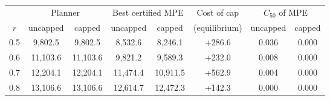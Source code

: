 \begin{tabular}{cccccccc}
\toprule
 & \multicolumn{2}{c}{Planner} & \multicolumn{2}{c}{Best certified MPE} & Cost of cap & \multicolumn{2}{c}{$C_{50}$ of MPE} \\
$r$ & uncapped & capped & uncapped & capped & (equilibrium) & uncapped & capped \\
\midrule
0.5 & 9{,}802.5 & 9{,}802.5 & 8{,}532.6 & 8{,}246.1 & +286.6 & 0.036 & 0.000 \\
0.6 & 11{,}103.6 & 11{,}103.6 & 9{,}821.2 & 9{,}589.3 & +232.0 & 0.008 & 0.000 \\
0.7 & 12{,}204.1 & 12{,}204.1 & 11{,}474.4 & 10{,}911.5 & +562.9 & 0.004 & 0.000 \\
0.8 & 13{,}106.6 & 13{,}106.6 & 12{,}614.7 & 12{,}472.3 & +142.3 & 0.000 & 0.000 \\
\bottomrule
\end{tabular}
